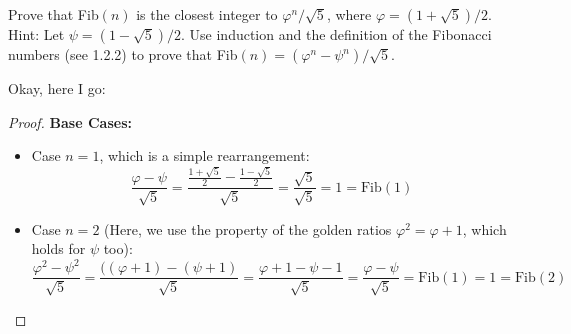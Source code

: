 \documentclass{../../sicp}
\date{August 15, 2024}
\newcommand{\Fib}{\mathrm{Fib}}
\begin{document}
\maketitle

\begin{displayquote}
	Prove that Fib$(n)$ is the closest integer to
	$\varphi^n / \sqrt{5}$, where $\varphi = (1 + \sqrt{5})/2$.
	Hint: Let $\psi = (1 - \sqrt{5})/2$.
	Use induction and the definition of the Fibonacci numbers (see 1.2.2) to prove that Fib$(n) = (\varphi^n - \psi^n)/\sqrt{5}$.
\end{displayquote}

Okay, here I go:

\begin{proof}
	\textbf{Base Cases:}
	\begin{itemize}
		\item Case ${n = 1}$, which is a simple rearrangement:
		      \[
			      \frac{\varphi - \psi}{\sqrt{5}} = \frac{\frac{1 + \sqrt{5}}{2} - \frac{1 - \sqrt{5}}{2}}{\sqrt{5}} = \frac{\sqrt{5}}{\sqrt{5}} = 1 = \Fib(1)
		      \]
		\item Case ${n = 2}$ (Here, we use the property of the golden ratios $\varphi^2 = \varphi + 1$, which holds for $\psi$ too):
		      \[
			      \frac{\varphi^2 - \psi^2}{\sqrt{5}} = \frac{((\varphi + 1) - (\psi + 1)}{\sqrt{5}} = \frac{\varphi + 1 - \psi - 1}{\sqrt{5}} = \frac{\varphi - \psi}{\sqrt{5}} = \Fib(1) = 1 = \Fib(2)
		      \]
	\end{itemize}


\end{proof}
\end{document}
